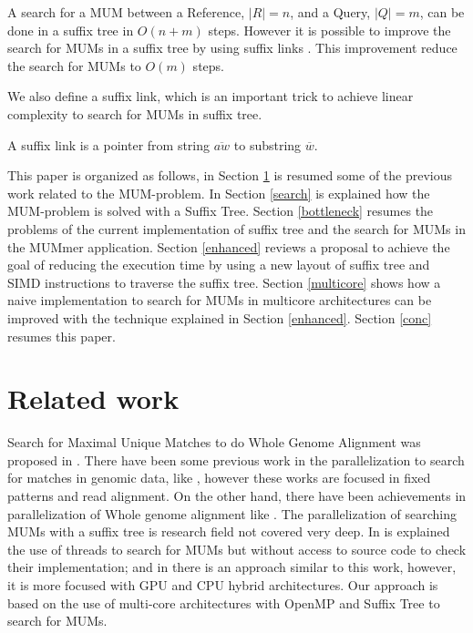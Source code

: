 \documentclass[conference]{IEEEtran}
\begin{document}
A search for a MUM between a Reference, $|R|=n$, and a Query, $|Q|=m$,  can be done in a suffix tree in $O(n+m)$ steps. However it is possible to improve the search for MUMs in a suffix tree by using suffix links \cite{Chang1991}. This improvement reduce the search for MUMs to $O(m)$ steps.

We also define a suffix link, which is an important trick to achieve linear complexity to search for MUMs in suffix tree.
\begin{mydef}
A suffix link is a pointer from string $\overline{aw}$ to substring $\overline{w}$.
\end{mydef}

This paper is organized as follows, in Section \ref{relwork} is resumed some of the previous work related to the MUM-problem. In Section \ref{search} is explained how the MUM-problem is solved with a Suffix Tree. Section \ref{bottleneck} resumes the problems of the current implementation of suffix tree and the search for MUMs in the MUMmer application. Section \ref{enhanced} reviews a proposal to achieve the goal of reducing the execution time by using a new layout of suffix tree and SIMD instructions to traverse the suffix tree. Section \ref{multicore} shows how a naive implementation to search for MUMs in multicore architectures can be improved with the technique explained in Section \ref{enhanced}. Section \ref{conc} resumes this paper.

\section{Related work}
\label{relwork}
Search for Maximal Unique Matches to do Whole Genome Alignment was proposed in \cite{Delcher1999}. There have been some previous work in the parallelization to search for matches in genomic data, like \cite{OguzhanKulekci2011,Mongelli,Kouzinopoulos2005}, however these works are focused in fixed patterns and read alignment. On the other hand, there have been achievements in parallelization of Whole genome alignment like \cite{Meng2005}. The parallelization of searching MUMs with a suffix tree is research field not covered very deep. In \cite{Encarnac2011} is explained the use of threads to search for MUMs but without access to source code to check their implementation; and in \cite{Schatz2007} there is an approach similar to this work, however, it is more focused with GPU and CPU hybrid architectures. Our approach is based on the use of multi-core architectures with OpenMP and Suffix Tree to search for MUMs.
\end{document}
